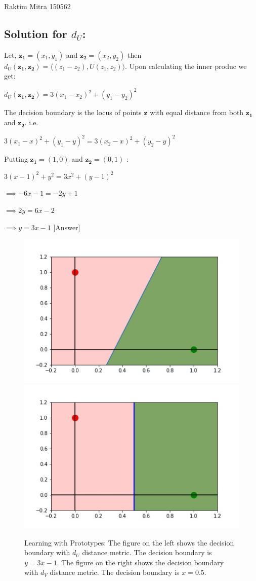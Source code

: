 \documentclass[a4paper,11pt]{article}
\newcommand\tab[1][0.6cm]{\hspace*{#1}}
\begin{document}
								{Raktim Mitra}      						           		%
								{150562}																		%

\begin{mlsolution}
\subsection*{Solution for $d_U$:}
	Let, $\mathbf{z_1}=(x_1,y_1)$ and $\mathbf{z_2}=(x_2,y_2)$ then $d_U(\mathbf{z_1,z_2}) = \langle(z_1 - z_2),U(z_1,z_2) \rangle$. Upon calculating the inner produc we get:
	
	$d_U(\mathbf{z_1,z_2}) = 3(x_1 - x_2)^2 + (y_1 - y_2)^2$
	
	The decision boundary is the locus of points $\mathbf{z}$ with equal distance from both $\mathbf{z_1}$ and $\mathbf{z_2}$. i.e.
	
\tab $3(x_1 - x)^2 + (y_1 - y)^2 = 3(x_2 - x)^2 + (y_2 - y)^2$

Putting $\mathbf{z_1} = (1,0)$ and $\mathbf{z_2} = (0,1)$ :

\tab $3(x-1)^2 + y^2 = 3x^2 + (y-1)^2$

$\implies -6x - 1 = -2y + 1$

$\implies 2y = 6x - 2$

$\implies y = 3x - 1$ [Answer]


\begin{figure}[th]%
\centering

\includegraphics[width=0.5\columnwidth]{q1/d1.jpg}%
\hfill
\includegraphics[width=0.5\columnwidth]{q1/d2.jpg}%
\caption{Learning with Prototypes: The figure on the left shows the decision boundary with $d_U$ distance metric. The decision boundary is $y= 3x-1$. The figure on the right shows the decision boundary with $d_V$ distance metric. The decision boundary is $x = 0.5$. }
\label{fig:proto}%
\end{figure}

\end{mlsolution}
\end{document}
